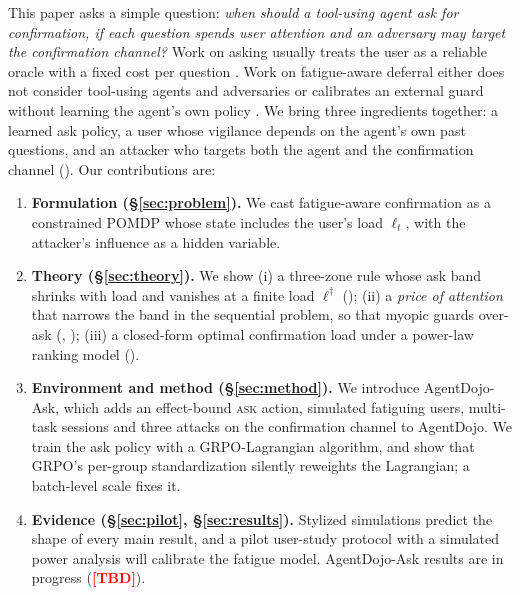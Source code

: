 \documentclass[10pt]{article}
\newcommand{\TBD}{\textcolor{red}{\textbf{[TBD]}}\xspace}
\newcommand{\ASK}{\textup{\textsc{ask}}\xspace}
\newcommand{\ADA}{AgentDojo-Ask\xspace}
\theoremstyle{plain}
\theoremstyle{definition}
\begin{document}
This paper asks a simple question: \emph{when should a tool-using agent ask for confirmation, if each question spends user attention and an adversary may target the confirmation channel?} Work on asking usually treats the user as a reliable oracle with a fixed cost per question \citep{overman2026oversight,trinh2026hilbench,dossantos2026act,zhang2026askless}. Work on fatigue-aware deferral either does not consider tool-using agents and adversaries \citep{zhang2026falcon} or calibrates an external guard without learning the agent's own policy \citep{turan2026oversight}. We bring three ingredients together: a learned ask policy, a user whose vigilance depends on the agent's own past questions, and an attacker who targets both the agent and the confirmation channel (). Our contributions are:
\begin{enumerate}[leftmargin=*]
\item \textbf{Formulation (\S\ref{sec:problem}).} We cast fatigue-aware confirmation as a constrained POMDP whose state includes the user's load $\ell_t$, with the attacker's influence as a hidden variable.
\item \textbf{Theory (\S\ref{sec:theory}).} We show (i) a three-zone rule whose ask band shrinks with load and vanishes at a finite load $\ell^\dagger$ (); (ii) a \emph{price of attention} that narrows the band in the sequential problem, so that myopic guards over-ask (, ); (iii) a closed-form optimal confirmation load under a power-law ranking model ().
\item \textbf{Environment and method (\S\ref{sec:method}).} We introduce \ADA, which adds an effect-bound \ASK action, simulated fatiguing users, multi-task sessions and three attacks on the confirmation channel to AgentDojo. We train the ask policy with a GRPO-Lagrangian algorithm, and show that GRPO's per-group standardization silently reweights the Lagrangian; a batch-level scale fixes it.
\item \textbf{Evidence (\S\ref{sec:pilot}, \S\ref{sec:results}).} Stylized simulations predict the shape of every main result, and a pilot user-study protocol with a simulated power analysis will calibrate the fatigue model. \ADA results are in progress (\TBD).
\end{enumerate}
\end{document}
